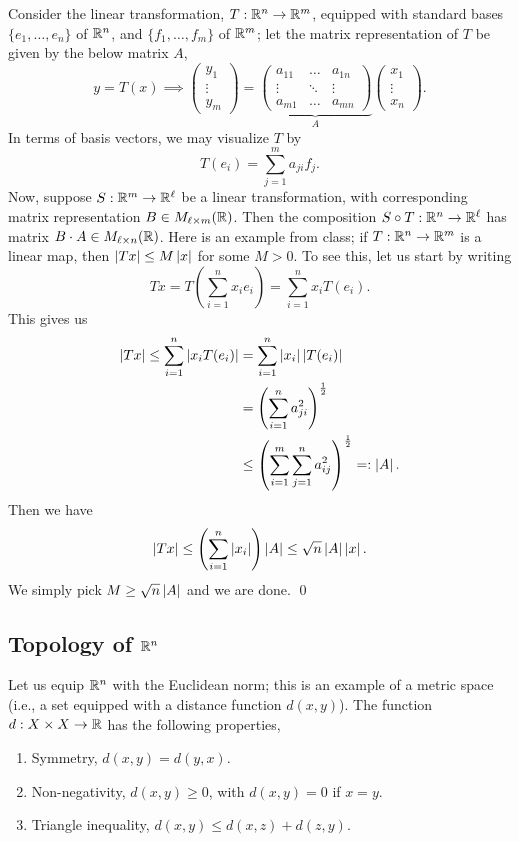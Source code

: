 \newpage
\noindent Consider the linear transformation, $T : \mathbb R^n \to \mathbb R^m$, equipped with standard bases $\{e_1, \dots, e_n\}$ of $\mathbb R^n$, and $\{f_1, \dots, f_m\}$ of $\mathbb R^m$; let the matrix representation of $T$ be given by the below matrix $A$,
\[ y = T(x) \implies \begin{pmatrix} y_1 \\ \vdots \\ y_m \end{pmatrix} = \underbrace{\begin{pmatrix} a_{11} & \dots & a_{1n} \\ \vdots & \ddots & \vdots \\ a_{m1} & \dots & a_{mn} \end{pmatrix}}_{A} \begin{pmatrix} x_1 \\ \vdots \\ x_n \end{pmatrix}. \]
In terms of basis vectors, we may visualize $T$ by
\[ T(e_i) = \sum_{j=1}^m a_{ji} f_j. \]
Now, suppose $S : \mathbb R^m \to \mathbb R^\ell$ be a linear transformation, with corresponding matrix representation $B \in M_{\ell \times m}(\mathbb R)$. Then the composition $S \circ T : \mathbb R^n \to \mathbb R^\ell$ has matrix $B \cdot A \in M_{\ell \times n}(\mathbb R)$.
\medskip\newline
\noindent Here is an example from class; if $T : \mathbb R^n \to \mathbb R^m$ is a linear map, then $\left\lvert Tx \right\rvert \leq M \left\lvert x \right\rvert$ for some $M > 0$. To see this, let us start by writing
\[ Tx = T \left( \sum_{i=1}^n x_ie_i \right) = \sum_{i=1}^n x_i T(e_i). \]
This gives us
\begin{align*}
    \left\lvert Tx \right\rvert \leq \sum_{i=1}^n \left\lvert x_i T(e_i) \right\rvert &= \sum_{i=1}^n \left\lvert x_i \right\rvert \left\lvert T(e_i) \right\rvert \\
    &= \left(\sum_{i=1}^n a_{ji}^2 \right)^{\frac{1}{2}} \\
    &\leq \left( \sum_{i=1}^m \sum_{j=1}^n a_{ij}^2 \right)^\frac{1}{2} =: \left\lvert A \right\rvert.
\end{align*} 
Then we have
\[ \left\lvert Tx \right\rvert \leq \left(\sum_{i=1}^n \left\lvert x_i \right\rvert\right) \left\lvert A \right\rvert \leq \sqrt{n} \left\lvert A \right\rvert \left\lvert x \right\rvert. \]
We simply pick $M \geq \sqrt{n} \left\lvert A \right\rvert$ and we are done. \qed

\subsection{Topology of $\mathbb R^n$}
Let us equip $\mathbb R^n$ with the Euclidean norm; this is an example of a metric space (i.e., a set equipped with a distance function $d(x, y)$). The function $d : X \times X \to \mathbb R$ has the following properties,
\begin{enumerate}[label=(\alph*)]
    \item Symmetry, $d(x, y) = d(y, x)$.
    \item Non-negativity, $d(x, y) \geq 0$, with $d(x, y) = 0$ if $x = y$.
    \item Triangle inequality, $d(x, y) \leq d(x, z) + d(z, y)$.
\end{enumerate}